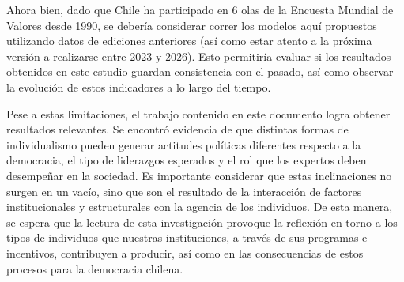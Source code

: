 \documentclass[12pt,twoside]{templates/facsothesis}
\begin{document}
Ahora bien, dado que Chile ha participado en 6 olas de la Encuesta Mundial de Valores desde 1990, se debería considerar correr los modelos aquí propuestos utilizando datos de ediciones anteriores (así como estar atento a la próxima versión a realizarse entre 2023 y 2026). Esto permitiría evaluar si los resultados obtenidos en este estudio guardan consistencia con el pasado, así como observar la evolución de estos indicadores a lo largo del tiempo.

Pese a estas limitaciones, el trabajo contenido en este documento logra obtener resultados relevantes. Se encontró evidencia de que distintas formas de individualismo pueden generar actitudes políticas diferentes respecto a la democracia, el tipo de liderazgos esperados y el rol que los expertos deben desempeñar en la sociedad. Es importante considerar que estas inclinaciones no surgen en un vacío, sino que son el resultado de la interacción de factores institucionales y estructurales con la agencia de los individuos. De esta manera, se espera que la lectura de esta investigación provoque la reflexión en torno a los tipos de individuos que nuestras instituciones, a través de sus programas e incentivos, contribuyen a producir, así como en las consecuencias de estos procesos para la democracia chilena.


\cleardoublepage
\pagestyle{fancyplain}
\fancyhf{}
{}


\end{document}
